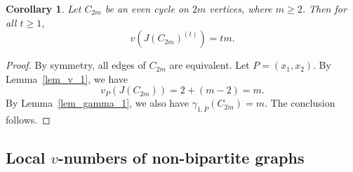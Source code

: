 \documentclass[12pt,amscd]{amsart}
\newtheorem{cor}[thm]{Corollary}
\theoremstyle{definition}
\numberwithin{equation}{section}
\begin{document}
\begin{cor}
Let $C_{2m}$ be an even cycle on $2m$ vertices, where $m \ge 2$. Then for all $t \ge 1$,
\[
v(J(C_{2m})^{(t)}) = tm.
\]
\end{cor}

\begin{proof}
By symmetry, all edges of $C_{2m}$ are equivalent. Let $P = (x_1, x_2)$. By Lemma~\ref{lem_v_1}, we have 
\[
v_P(J(C_{2m})) = 2 + (m - 2) = m.
\]
By Lemma~\ref{lem_gamma_1}, we also have $\gamma_{1,P}(C_{2m}) = m$. The conclusion follows.
\end{proof}

\subsection{Local $v$-numbers of non-bipartite graphs}
\end{document}

